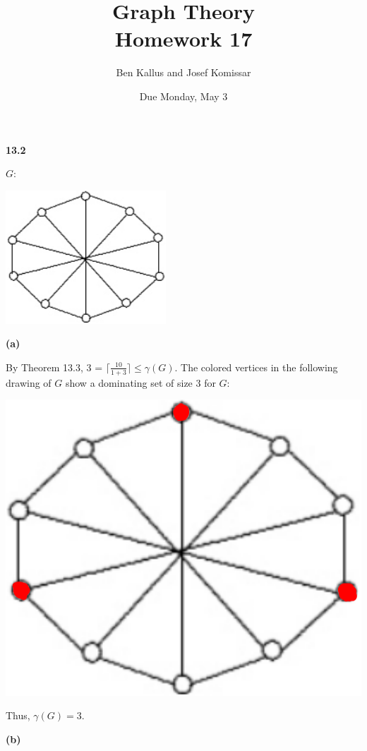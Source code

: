 \documentclass[12pt]{article}
\title{Graph Theory \\ Homework 17}
\author{Ben Kallus and Josef Komissar}
\date{Due Monday, May 3}
\begin{document}
\maketitle


\medskip\noindent\textbf{13.2}

    $G$:
    \begin{center} \includegraphics{1.png} \end{center}

\medskip\noindent\textbf{(a)}
    
    By Theorem 13.3, 3 = $\lceil \frac{10}{1 + 3} \rceil  \leq \gamma(G)$.
    The colored vertices in the following drawing of $G$ show a dominating set of size 3 for $G$:
    \begin{center} \includegraphics[scale=.4]{2.png} \end{center}
    Thus, $\gamma(G) = 3$.

\medskip\noindent\textbf{(b)}
\end{document}
